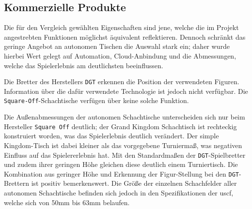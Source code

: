 \hypertarget{kommerzielle-produkte}{%
\subsection{Kommerzielle Produkte}\label{kommerzielle-produkte}}

Die für den Vergleich gewählten Eigenschaften sind jene, welche die im
Projekt angestrebten Funktionen möglichst äquivalent reflektieren.
Dennoch schränkt das geringe Angebot an autonomen Tischen die Auswahl
stark ein; daher wurde hierbei Wert gelegt auf Automation,
Cloud-Anbindung und die Abmessungen, welche das Spielerlebnis am
deutlichsten beeinflussen.

Die Bretter des Herstellers \passthrough{\lstinline!DGT!} erkennen die
Position der verwendeten Figuren. Information über die dafür verwendete
Technologie ist jedoch nicht verfügbar. Die
\passthrough{\lstinline!Square-Off!}-Schachtische verfügen über keine
solche Funktion.

Die Außenabmessungen der autonomen Schachtische unterscheiden sich nur
beim Hersteller \passthrough{\lstinline!Square Off!} deutlich; der Grand
Kingdom Schachtisch ist rechteckig konstruiert worden, was das
Spielerlebnis deutlich verändert. Der simple Kingdom-Tisch ist dabei
kleiner als das vorgegebene Turniermaß, was negativen Einfluss auf das
Spielererlebnis hat. Mit den Standardmaßen der
\passthrough{\lstinline!DGT!}-Spielbretter und zudem ihrer geringen Höhe
gleichen diese deutlich einem Turniertisch. Die Kombination aus geringer
Höhe und Erkennung der Figur-Stellung bei den
\passthrough{\lstinline!DGT!}-Brettern ist positiv bemerkenswert. Die
Größe der einzelnen Schachfelder aller autonomen Schachtische befinden
sich jedoch in den Spezifikationen der
\gls{uscf}\cite{officialuscfrules}, welche sich von 50mm bis 63mm
belaufen.

\pagebreak

